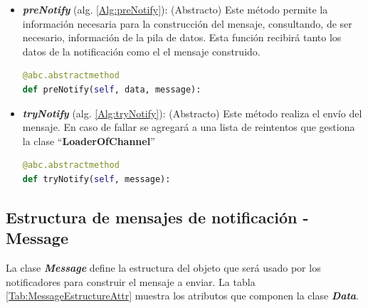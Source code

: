 \begin{itemize}
            \item \textbf{\textit{preNotify}} (alg. \ref{Alg:preNotify}):
            (Abstracto) Este método permite la información necesaria para la construcción del mensaje, consultando, de ser necesario, información de la pila de datos. Esta función recibirá tanto los datos de la notificación como el el mensaje construido.
            \begin{lstlisting}[language=Python, caption={Firma del método "\textit{preNotify}" de la clase NotificationChannel.}, label=Alg:preNotify, numbers=none]
@abc.abstractmethod
def preNotify(self, data, message):
            \end{lstlisting}
            
            \item \textbf{\textit{tryNotify}} (alg. \ref{Alg:tryNotify}):
            (Abstracto) Este método realiza el envío del mensaje. En caso de fallar se agregará a una lista de reintentos que gestiona la clase ``\textbf{LoaderOfChannel}''
            \begin{lstlisting}[language=Python, caption={Firma del método "\textit{tryNotify}" de la clase NotificationChannel.}, label=Alg:tryNotify, numbers=none]
@abc.abstractmethod
def tryNotify(self, message):
            \end{lstlisting}
            
        \end{itemize}
        
    \subsection{Estructura de mensajes de notificación - Message}
    \label{sub:NotifyMessage}        
         La clase \textbf{\textit{Message}} define la estructura del objeto que será usado por los notificadores para construir el mensaje a enviar. La tabla \ref{Tab:MessageEstructureAttr} muestra los atributos que componen la clase \textbf{\textit{Data}}.
        
